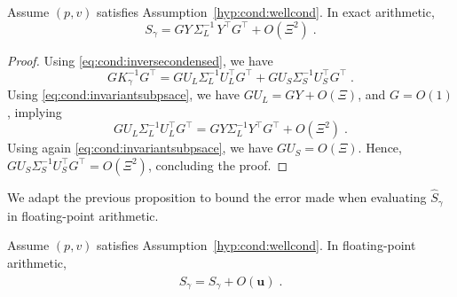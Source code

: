 \documentclass[smallextended]{svjour3}
\newcommand{\epstol}{\mathbf{u}}
\begin{document}
\begin{proposition}
  Assume $(p, v)$ satisfies Assumption~\ref{hyp:cond:wellcond}.
  In exact arithmetic,
  \begin{equation}
    S_\gamma = GY \, \Sigma_L^{-1} \, Y^\top G^\top + O(\Xi^2) \; .
  \end{equation}
\end{proposition}
\begin{proof}
  Using \eqref{eq:cond:inversecondensed}, we have
  \begin{equation}
    G K_\gamma^{-1} G^\top =
    G U_L \Sigma_L^{-1} U_L^\top G^\top + G U_S \Sigma_S^{-1} U_S^\top G^\top \;.
  \end{equation}
  Using \eqref{eq:cond:invariantsubpsace}, we have $G U_L = GY + O(\Xi)$,
  and $G = O(1)$, implying
  \begin{equation}
    G U_L \Sigma_L^{-1} U_L^\top G^\top = G Y  \Sigma_L^{-1} Y^\top G^\top + O(\Xi^2) \; .
  \end{equation}
  Using again \eqref{eq:cond:invariantsubpsace}, we have $G U_S = O(\Xi)$.
  Hence, $G U_S \Sigma_S^{-1} U_S^\top G^\top = O(\Xi^2)$,
  concluding the proof.
\end{proof}
We adapt the previous proposition to bound the error made when evaluating
$\widehat{S}_\gamma$ in floating-point arithmetic.
\begin{proposition}
  Assume $(p, v)$ satisfies Assumption~\ref{hyp:cond:wellcond}.
  In floating-point arithmetic,
  \begin{equation}
    \label{eq:cond:errorSgamma}
    \widehat{S}_\gamma = S_\gamma + O(\epstol) \; .
  \end{equation}
\end{proposition}
\end{document}
